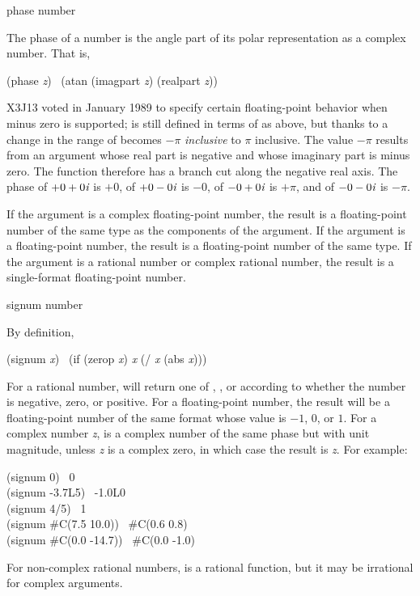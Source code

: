 \begin{defun}[Function]
phase number

The phase of a number is the angle part of its polar representation
as a complex number.  That is,
\begin{lisp}
(phase \emph{z}) \EQ\ (atan (imagpart \emph{z}) (realpart \emph{z}))
\end{lisp}

\begin{new}
X3J13 voted in January 1989
to specify certain floating-point behavior when minus zero is supported;
 is still defined in terms of  as above,
but thanks to a change in  the range of 
becomes $-\pi$ \emph{inclusive} to $\pi$ inclusive.  The value $-\pi$
results from an argument
whose real part is negative and whose imaginary
part is minus zero.  The  function therefore has a branch cut
along the negative real axis.  The phase of $+0+0\emph{i}$ is $+0$, of $+0-0\emph{i}$ is $-0$,
of $-0+0\emph{i}$ is $+\pi$, and of $-0-0\emph{i}$ is $-\pi$.
\end{new}

If the argument is a complex floating-point number, the result
is a floating-point number of the same type as the components of
the argument.
If the argument is a floating-point number, the result is a
floating-point number of the same type.
If the argument is a rational number or complex rational number, the result
is a single-format floating-point number.
\end{defun}

\begin{defun}[Function]
signum number

By definition,
\begin{lisp}
(signum \emph{x}) \EQ\ (if (zerop \emph{x}) \emph{x} (/ \emph{x} (abs \emph{x})))
\end{lisp}
For a rational number,  will return one of , , or 
according to whether the number is negative, zero, or positive.
For a floating-point number, the result will be a floating-point number
of the same format whose value is $-1$, $0$, or $1$.
For a complex number \emph{z},  is a complex number of
the same phase but with unit magnitude, unless \emph{z} is a complex zero,
in which case the result is \emph{z}.
For example:
\begin{lisp}
(signum 0) \EV\ 0 \\
(signum -3.7L5) \EV\ -1.0L0 \\
(signum 4/5) \EV\ 1 \\
(signum \#C(7.5 10.0)) \EV\ \#C(0.6 0.8) \\
(signum \#C(0.0 -14.7)) \EV\ \#C(0.0 -1.0)
\end{lisp}
For non-complex rational numbers,  is a rational function,
but it may be irrational for complex arguments.
\end{defun}

